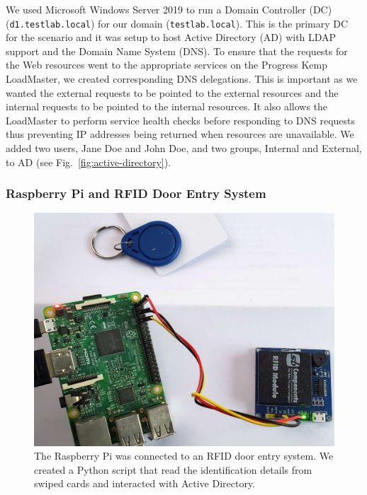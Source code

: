 We used Microsoft Windows Server 2019 to run a Domain Controller (DC)
(\texttt{d1.testlab.local}) for our domain (\texttt{testlab.local}).
This is the primary DC for the scenario and it was setup to host
Active Directory (AD) with LDAP support and the Domain Name System
(DNS).  To ensure that the requests for the Web resources went to the
appropriate services on the Progress Kemp LoadMaster, we created
corresponding DNS delegations.  This is important as we wanted the
external requests to be pointed to the external resources and the
internal requests to be pointed to the internal resources.  It also
allows the LoadMaster to perform service health checks before
responding to DNS requests thus preventing IP addresses being returned
when resources are unavailable.  We added two users, Jane Doe and John
Doe, and two groups, Internal and External, to AD (see
Fig.~\ref{fig:active-directory}).

\subsubsection{Raspberry Pi and RFID Door Entry System}

\begin{figure}
  \centerline{\includegraphics[width=\columnwidth]{img/raspberry-pi-rfid}}
  \caption{The Raspberry Pi was connected to an RFID door entry
    system.  We created a Python script that read the identification
    details from swiped cards and interacted with Active
    Directory.}\label{fig:raspberry-pi-rfid}
\end{figure}

